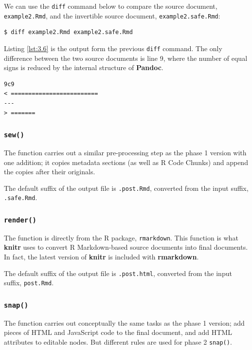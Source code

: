 \documentclass[a4paper, 12pt]{report}
\begin{document}
We can use the \texttt{diff} command below to compare the source document, \texttt{example2.Rmd}, and the invertible source document, \texttt{example2.safe.Rmd}:
\begin{lstlisting}[numbers=none, frame=none]
$ diff example2.Rmd example2.safe.Rmd
\end{lstlisting}

Listing \ref{lst:3.6} is the output form the previous \texttt{diff} command. The only difference between the two source documents is line 9, where the number of equal signs is reduced by the internal structure of \textbf{Pandoc}.
\begin{lstlisting}[caption={Output from \texttt{diff}}, label={lst:3.6}]
9c9
< =========================
---
> =======
\end{lstlisting}


\subsubsection*{\texttt{sew()}}
The function carries out a similar pre-processing step as the phase 1 version with one addition; it copies metadata sections (as well as R Code Chunks) and append the copies after their originals.

The default suffix of the output file is \texttt{.post.Rmd}, converted from the input suffix, \texttt{.safe.Rmd}.

\subsubsection*{\texttt{render()}}
The function is directly from the R package, \texttt{rmarkdown}. This function is what \textbf{knitr} uses to convert R Markdown-based source documents into final documents. In fact, the latest version of \textbf{knitr} is included with \textbf{rmarkdown}.

The default suffix of the output file is \texttt{.post.html}, converted from the input suffix, \texttt{post.Rmd}.

\subsubsection*{\texttt{snap()}}
The function carries out conceptually the same tasks as the phase 1 version; add pieces of HTML and JavaScript code to the final document, and add HTML attributes to editable nodes. But different rules are used for phase 2 \texttt{snap()}.
\end{document}
